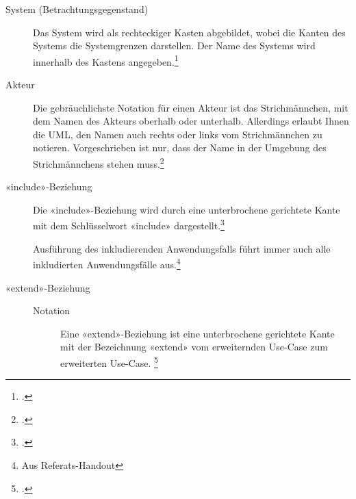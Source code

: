 \documentclass{bschlangaul-theorie}
\begin{document}
\begin{description}
\item[System (Betrachtungsgegenstand)]

Das System wird als rechteckiger Kasten abgebildet, wobei die Kanten des
Systems die Systemgrenzen darstellen. Der Name des Systems wird
innerhalb des Kastens angegeben.\footcite[Seite 249]{rupp}


%

\item[Akteur]

Die gebräuchlichste Notation für einen Akteur ist das Strichmännchen,
mit dem Namen des Akteurs oberhalb oder unterhalb. Allerdings erlaubt
Ihnen die UML, den Namen auch rechts oder links vom Strichmännchen zu
notieren. Vorgeschrieben ist nur, dass der Name in der Umgebung des
Strichmännchens stehen muss.\footcite[Seite 252]{rupp}


%

\item[«include»-Beziehung] Die «include»-Beziehung wird durch eine
unterbrochene gerichtete Kante mit dem Schlüs­selwort «include»
dargestellt.\footcite[Seite 256]{rupp}

Ausführung des inkludierenden Anwendungsfalls führt immer auch alle
inkludierten Anwendungsfälle aus.\footnote{Aus Referats-Handout}


%

\item[«extend»-Beziehung]

\begin{description}
\item[Notation]

Eine «extend»-Beziehung ist eine unterbrochene gerichtete Kante mit der
Bezeichnung «extend» vom erweiternden Use-Case zum erweiterten Use-Case.
\footcite[Seite 258]{rupp}


\end{description}
\end{description}
\end{document}
